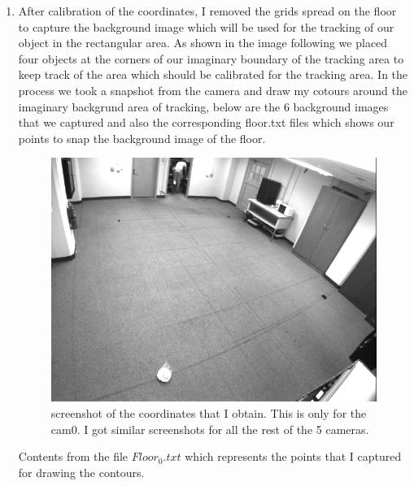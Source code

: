\documentclass{article}
\begin{document}
\begin{enumerate}
\item After calibration of the coordinates, I removed the grids spread on the floor to capture the background image which will be used for the tracking of our object in the rectangular area. As shown in the image following we placed four objects at the corners of our imaginary boundary of the tracking area to keep track of the area which should be calibrated for the tracking area. In the process we took a snapshot from the camera and draw my cotours around the imaginary backgrund area of tracking, below are the 6 background images that we captured and also the corresponding floor.txt files which shows our points to snap the background image of the floor.
\newpage
\begin{figure}[!htb]
    \centering
  		\includegraphics[scale=0.6]{Background0.png}
  		\caption{screenshot of the coordinates that I obtain. This is only for the cam0. I got similar screenshots for all the rest of the 5 cameras.}
  		\label{Fig8} 
 \end{figure} 
Contents from  the file $Floor_0.txt$ which represents the points that I captured for drawing the contours.



\end{enumerate}
\end{document}
